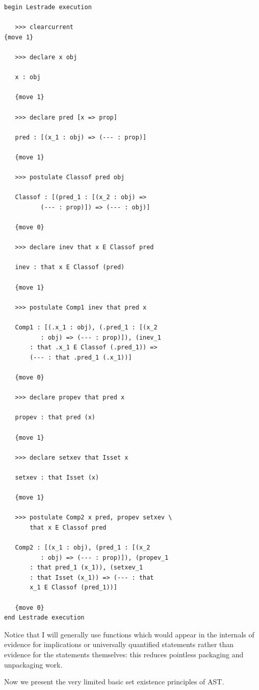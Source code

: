 \documentclass[12pt]{article}
\begin{document}
\begin{verbatim}
begin Lestrade execution

   >>> clearcurrent
{move 1}

   >>> declare x obj

   x : obj

   {move 1}

   >>> declare pred [x => prop]

   pred : [(x_1 : obj) => (--- : prop)]

   {move 1}

   >>> postulate Classof pred obj

   Classof : [(pred_1 : [(x_2 : obj) => 
          (--- : prop)]) => (--- : obj)]

   {move 0}

   >>> declare inev that x E Classof pred

   inev : that x E Classof (pred)

   {move 1}

   >>> postulate Comp1 inev that pred x

   Comp1 : [(.x_1 : obj), (.pred_1 : [(x_2 
          : obj) => (--- : prop)]), (inev_1 
       : that .x_1 E Classof (.pred_1)) => 
       (--- : that .pred_1 (.x_1))]

   {move 0}

   >>> declare propev that pred x

   propev : that pred (x)

   {move 1}

   >>> declare setxev that Isset x

   setxev : that Isset (x)

   {move 1}

   >>> postulate Comp2 x pred, propev setxev \
       that x E Classof pred

   Comp2 : [(x_1 : obj), (pred_1 : [(x_2 
          : obj) => (--- : prop)]), (propev_1 
       : that pred_1 (x_1)), (setxev_1 
       : that Isset (x_1)) => (--- : that 
       x_1 E Classof (pred_1))]

   {move 0}
end Lestrade execution

\end{verbatim}

Notice that I will generally use functions which would appear in the internals of evidence for implications or universally quantified statements rather than evidence for the statements themselves:  this reduces pointless packaging and unpackaging work.

Now we present the very limited basic set existence principles of AST.
\end{document}
